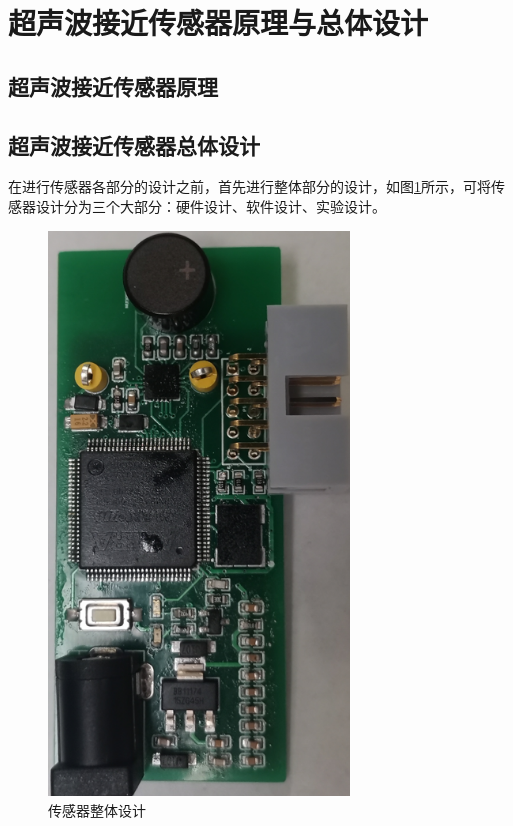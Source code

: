     \newpage
	\section{超声波接近传感器原理与总体设计}
 \subsection{超声波接近传感器原理}

 
 \subsection{超声波接近传感器总体设计}
	在进行传感器各部分的设计之前，首先进行整体部分的设计，如图\ref{传感器整体设计}所示，可将传感器设计分为三个大部分：硬件设计、软件设计、实验设计。
\begin{figure}[ht]
	    \centering
	    \includegraphics[width=8cm,angle=-90]{figure/physical map.png}
	    \caption{传感器整体设计}
	    \label{传感器整体设计}
\end{figure}

